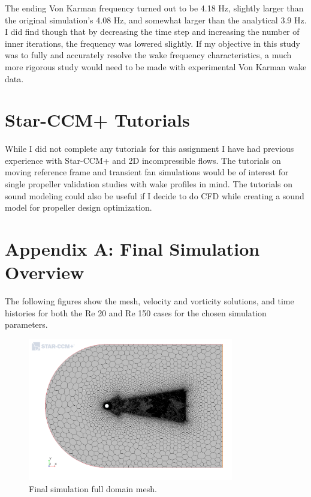 \documentclass[10pt,english]{article}
\begin{document}
The ending Von Karman frequency turned out to be 4.18 Hz, slightly larger than the original simulation's 4.08 Hz, and somewhat larger than the analytical 3.9 Hz.  I did find though that by decreasing the time step and increasing the number of inner iterations, the frequency was lowered slightly.  If my objective in this study was to fully and accurately resolve the wake frequency characteristics, a much more rigorous study would need to be made with experimental Von Karman wake data.

\newpage
\section{Star-CCM+ Tutorials}

   While I did not complete any tutorials for this assignment I have had previous experience with Star-CCM+ and 2D incompressible flows.  The tutorials on moving reference frame and transient fan simulations would be of interest for single propeller validation studies with wake profiles in mind.  The tutorials on sound modeling could also be useful if I decide to do CFD while creating a sound model for propeller design optimization.  

\section{Appendix A: Final Simulation Overview}

The following figures show the mesh, velocity and vorticity solutions, and time histories for both the Re 20 and Re 150 cases for the chosen simulation parameters.

 \begin{figure}[h]
\centering
\includegraphics[trim={0.0cm 0cm 0.0cm 0cm},clip,width=0.8\textwidth]{cylinder_2_016_MeshScene2.png}
\vspace{-5pt}
\caption{Final simulation full domain mesh. }
\label{f:cylinder_2_016_MeshScene2}
\end{figure}
\end{document}
